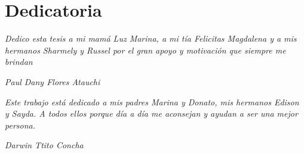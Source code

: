 \chapter*{Dedicatoria}

\textit{Dedico esta tesis a mi mamá Luz Marina, a mi tía Felicitas Magdalena y a mis hermanos Sharmely y Russel por el gran apoyo y motivación que siempre me brindan} 
\begin{flushright}\textit{Paul Dany Flores Atauchi}\end{flushright}

\vspace{1cm}
\textit{Este trabajo está dedicado a mis padres Marina y Donato, mis hermanos Edison y Sayda. A todos ellos porque día a día me aconsejan y ayudan a ser una mejor persona.}
\begin{flushright}\textit{Darwin Ttito Concha}\end{flushright}
